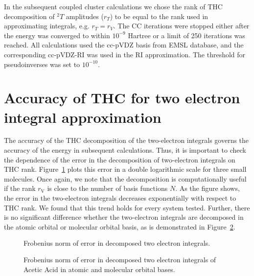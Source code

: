 In the subsequent coupled cluster calculations we chose the rank of THC 
decomposition of ${}^2T$ amplitudes ($r_{T}$) to be equal to the rank 
used in approximating integrals, e.g. $r_{T} = r_{V}$. 
The CC iterations were stopped either after the energy was converged to within 
$10^{-9}$ Hartree or a limit of 250 iterations 
was reached. All calculations used the cc-pVDZ basis from EMSL
database,\cite{schuchardt2007basis} and the corresponding cc-pVDZ-RI
was used in the RI approximation. The threshold for pseudoinverses was set to 
$10^{-10}$.

\section{Accuracy of THC for two electron integral approximation}
The accuracy of the THC decomposition of the two-electron integrals governs the
accuracy of the energy in subsequent calculations. Thus, it is important to 
check the dependence of the error in the decomposition of
two-electron integrals on THC rank. Figure~\ref{fig:thc_err_mo_3systems} plots 
this error in a double logarithmic scale for three small molecules. Once again, 
we note that the decomposition is computationally useful if the rank 
$r_\mathrm{V}$ is close to the number of basis functions $N$.  As the figure 
shows, the error in the two-electron integrals decreases exponentially with
respect to THC rank.  We found that this trend holds for every system
tested. Further, there is no significant difference whether the two-electron 
integrals are decomposed in the atomic orbital or molecular orbital basis, as 
is demonstrated in Figure~\ref{fig:thc_err_ao_vs_mo}.

%
\begin{figure}[tb]
\caption{Frobenius norm of error in decomposed two electron integrals.
\label{fig:thc_err_mo_3systems}}
\end{figure}
%
\begin{figure}[tb]
\caption{Frobenius norm of error in decomposed two electron integrals of Acetic 
Acid in atomic and molecular orbital bases.
\label{fig:thc_err_ao_vs_mo}}
\end{figure}
%

